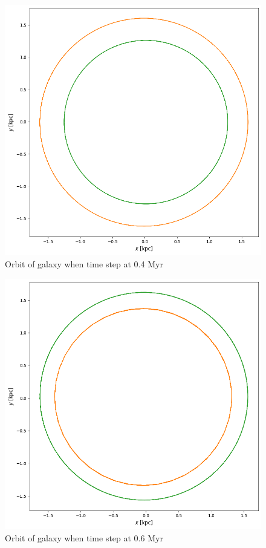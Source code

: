 \documentclass[linenumbers,RNAAS,trackchanges]{aastex631}
\begin{document}
\begin{figure}[H]
    \centering
    \includegraphics[scale=.50]{vip/normal.png}
    \caption{Orbit of galaxy when time step at 0.4 Myr}
    \label{fig:code}
\end{figure}
\begin{figure}[H]
    \centering
    \includegraphics[scale=.50]{vip/0.6.png}
    \caption{Orbit of galaxy when time step at 0.6 Myr}
    \label{fig:code}
\end{figure}
\end{document}
